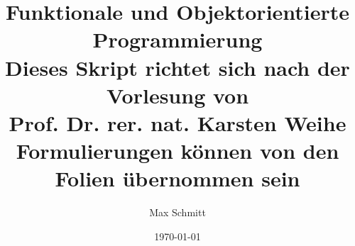 \documentclass[a4paper,12pt,liststotoc, parskip=half]{scrreprt}
\begin{document}
    \pagestyle{fancy}

    \title{
      Funktionale und Objektorientierte Programmierung\\
      \large Dieses Skript richtet sich nach der Vorlesung von \\ Prof. Dr. rer. nat. Karsten Weihe \\ Formulierungen können von den Folien übernommen sein}

    \date{\today}
    \author{Max Schmitt}
    \maketitle
    \pagestyle{fancy}
    \lhead{ }
    \chead{\leftmark}
    \rhead{}

    \cfoot{\thepage}
    \rfoot{ %
    \date{\today} }

    \begingroup
      \renewcommand*{\chapterpagestyle}{empty}
      \pagestyle{empty}
      \tableofcontents
    \endgroup


    \clearpage

    
    
    
    
		
    \appendix

    
\end{document}

